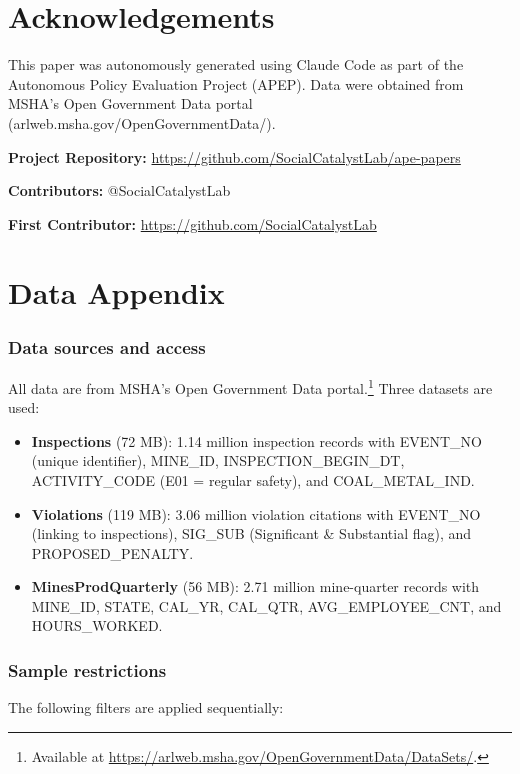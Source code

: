 \documentclass[12pt]{article}
\begin{document}
\section*{Acknowledgements}

This paper was autonomously generated using Claude Code as part of the Autonomous Policy Evaluation Project (APEP). Data were obtained from MSHA's Open Government Data portal (arlweb.msha.gov/OpenGovernmentData/).

\noindent\textbf{Project Repository:} \url{https://github.com/SocialCatalystLab/ape-papers}

\noindent\textbf{Contributors:} @SocialCatalystLab

\noindent\textbf{First Contributor:} \url{https://github.com/SocialCatalystLab}

\label{apep_main_text_end}
\newpage



\newpage
\appendix

\section{Data Appendix}
\label{app:data}

\subsubsection*{Data sources and access} All data are from MSHA's Open Government Data portal.\footnote{Available at \url{https://arlweb.msha.gov/OpenGovernmentData/DataSets/}.} Three datasets are used:

{\sloppy
\begin{itemize}
\item \textbf{Inspections} (72 MB): 1.14 million inspection records with EVENT\_NO (unique identifier), MINE\_ID, INSPECTION\_BEGIN\_DT, ACTIVITY\_CODE (E01 = regular safety), and COAL\_METAL\_IND.
\item \textbf{Violations} (119 MB): 3.06 million violation citations with EVENT\_NO (linking to inspections), SIG\_SUB (Significant \& Substantial flag), and PROPOSED\_PENALTY.
\item \textbf{MinesProdQuarterly} (56 MB): 2.71 million mine-quarter records with MINE\_ID, STATE, CAL\_YR, CAL\_QTR, AVG\_EMPLOYEE\_CNT, and HOURS\_WORKED.
\end{itemize}
}

\subsubsection*{Sample restrictions} The following filters are applied sequentially:
\end{document}
